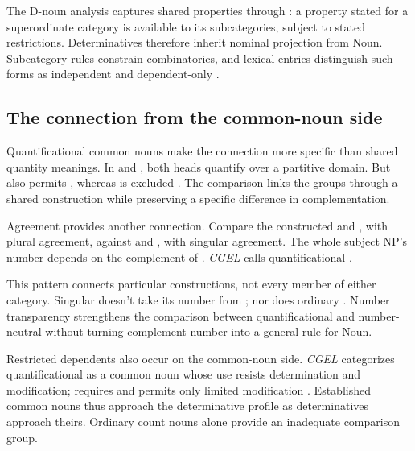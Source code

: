 \documentclass[12pt]{article}
\begin{document}
The D-noun analysis captures shared properties through : a property stated for a superordinate category is available to its subcategories, subject to stated restrictions. Determinatives therefore inherit nominal projection from Noun. Subcategory rules constrain combinatorics, and lexical entries distinguish such forms as independent  and dependent-only .

\subsection{The connection from the common-noun side}\label{sec:quant-nouns}

Quantificational common nouns make the connection more specific than shared quantity meanings. In  and , both heads quantify over a partitive domain. But  also permits , whereas  is excluded \citep[349]{huddleston2002}. The comparison links the groups through a shared construction while preserving a specific difference in complementation.

Agreement provides another connection. Compare the constructed  and , with plural agreement, against  and , with singular agreement. The whole subject NP's number depends on the complement of . \textit{CGEL} calls quantificational   \citep[349--350, 411--412]{huddleston2002}.

This pattern connects particular constructions, not every member of either category. Singular  doesn't take its number from ; nor does ordinary . Number transparency strengthens the comparison between quantificational  and number-neutral  without turning complement number into a general rule for Noun.

Restricted dependents also occur on the common-noun side. \textit{CGEL} categorizes quantificational  as a common noun whose use resists determination and modification;  requires  and permits only limited modification \citep[349--350]{huddleston2002}. Established common nouns thus approach the determinative profile as determinatives approach theirs. Ordinary count nouns alone provide an inadequate comparison group.
\end{document}
